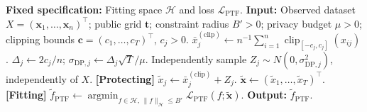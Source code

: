 \documentclass[twoside,11pt]{article}
\DeclareMathOperator*{\argmin}{argmin}
\newcommand{\blue}[1]{\textcolor{blue}{#1}}   %
\begin{document}
\begin{algorithm}[t]
\caption{Protect-Then-Fit (PTF); $\mathtt{PTF}(X, \mathbf{t}; B',\mu, \mathbf{c})$}
\label{alg: PTF}
\begin{algorithmic}[1]
\Statex \textbf{Fixed specification:} Fitting space $\mathcal{H}$ and loss $\mathcal L_{\mathrm{PTF}}$.
\State \textbf{Input:} Observed dataset $X=(\mathbf{x}_1,\ldots,\mathbf{x}_n)^\top$; public grid $\mathbf t$; constraint radius $B'>0$; privacy budget $\mu>0$; clipping bounds $\mathbf c=(c_1,\ldots,c_T)^\top$, $c_j>0$.
\State $\bar x_j^{(\mathrm{clip})}\gets n^{-1}\sum_{i=1}^n\operatorname{clip}_{[-c_j,c_j]}(x_{ij})$.
\State $\Delta_j\gets 2c_j/n$; $\sigma_{\mathrm{DP},j}\gets\Delta_j\sqrt T/\mu$.
\State Independently sample $Z_j\sim N(0,\sigma_{\mathrm{DP},j}^2)$, independently of $X$.
\State \textbf{[Protecting]} $\widetilde x_j\gets\bar x_j^{(\mathrm{clip})}+Z_j$.
\EndFor
\State $\widetilde{\mathbf x}\gets(\widetilde x_1,\ldots,\widetilde x_T)^\top$.
\State \textbf{[Fitting]} $\widetilde f_{\mathrm{PTF}}\gets\argmin_{f\in\mathcal H,\,\|f\|_{\mathcal H}\le B'}\mathcal L_{\mathrm{PTF}}(f;\widetilde{\mathbf x})$.
\State \textbf{Output:} $\widetilde f_{\mathrm{PTF}}$.
\end{algorithmic}
\end{algorithm}


\end{document}
